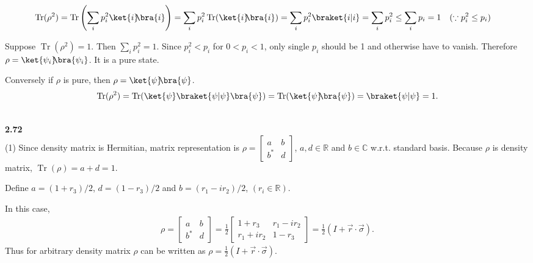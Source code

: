 \documentclass[10pt]{book}
\DeclareMathOperator{\Tr}{Tr}
\newcommand{\kb}[1]{\ket{#1}\hspace{-1mm} \bra{#1}} %
\newcommand{\Textbf}[1]{\hspace{3mm}\\ \textbf{#1}\\}
\begin{document}
	\begin{equation}
\begin{aligned}
		\Tr (\rho^2) &= \Tr \left(\sum_i p_i^2 \kb{i}\right)
		= \sum_i p_i^2 \Tr(\kb{i})
		= \sum_i p_i^2 \braket{i|i}
		= \sum_i p_i^2
		\leq \sum_i p_i = 1~~~ (\because p_i^2 \leq p_i)
	\end{aligned}
\end{equation}
	
	Suppose $\Tr (\rho^2) = 1$. Then $\sum_i p_i^2 = 1$.
	Since $p_i^2 < p_i$ for $0 < p_i < 1$,
	only single $p_i$ should be 1 and otherwise have to  vanish.
	Therefore $\rho = \kb{\psi_i}$. It is a pure state.
	
	Conversely if $\rho$ is pure, then $\rho = \kb{\psi}$.
	\begin{equation}
\begin{aligned}
		\Tr (\rho^2) = \Tr (\ket{\psi}\braket{\psi | \psi} \bra{\psi}) = \Tr (\kb{\psi}) = \braket{\psi | \psi} = 1.
	\end{aligned}
\end{equation}
	
	
	
	\Textbf{2.72}
	
	(1) Since density matrix is Hermitian, matrix representation is
	$\rho = \begin{bmatrix}
		a & b \\ b^* & d
	\end{bmatrix}$,
	$a, d \in \mathds{R}$ and $b \in \mathds{C}$ w.r.t. standard basis.
	Because $\rho$ is density matrix, $\Tr (\rho) = a+d = 1$.
	
	Define $a = (1+r_3)/2$, $d = (1-r_3)/2$ and $b = (r_1 - ir_2)/2$, $(r_i \in \mathds{R})$.
	
	In this case,
	\begin{equation}
\begin{aligned}
		\rho = \begin{bmatrix}
			a & b \\ b^* & d
		\end{bmatrix}
		=
		\frac{1}{2} \begin{bmatrix}
			1+r_3 & r_1 - ir_2 \\
			r_1 + ir_2 & 1 - r_3
		\end{bmatrix}
		=
		\frac{1}{2} (I + \vec{r} \cdot \vec{\sigma}).
	\end{aligned}
\end{equation}
	Thus for arbitrary density matrix $\rho$ can be written as $\rho = \frac{1}{2} (I + \vec{r} \cdot \vec{\sigma})$.
	
\end{document}
